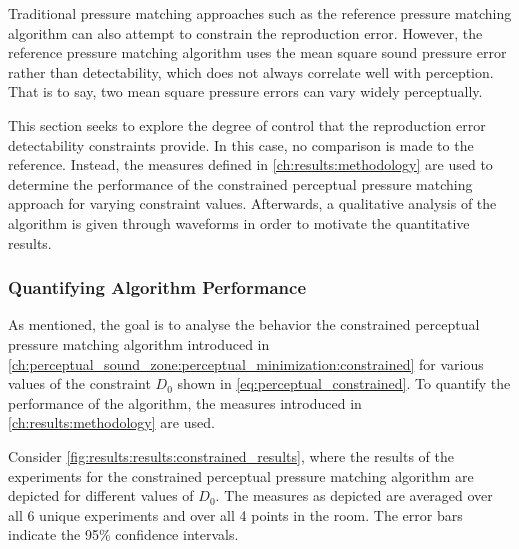 Traditional pressure matching approaches such as the reference pressure matching algorithm can also attempt to constrain the 
reproduction error.
However, the reference pressure matching algorithm uses the mean square sound pressure error rather than detectability,
which does not always correlate well with perception.
That is to say, two mean square pressure errors can vary widely perceptually.

This section seeks to explore the degree of control that the reproduction error detectability constraints provide.
In this case, no comparison is made to the reference.
Instead, the measures defined in \autoref{ch:results:methodology} are used to determine the performance of the 
constrained perceptual pressure matching approach for varying constraint values.
Afterwards, a qualitative analysis of the algorithm is given through waveforms in order to motivate the quantitative results.

\subsubsection*{Quantifying Algorithm Performance}

As mentioned, the goal is to analyse the behavior the constrained perceptual pressure matching algorithm
introduced in \autoref{ch:perceptual_sound_zone:perceptual_minimization:constrained} for various values of the 
constraint $D_0$ shown in \autoref{eq:perceptual_constrained}. 
To quantify the performance of the algorithm, the measures introduced in \autoref{ch:results:methodology} are used.

Consider \autoref{fig:results:results:constrained_results}, where the results of the 
experiments for the constrained perceptual pressure matching algorithm are depicted for different values of $D_0$. 
The measures as depicted are averaged over all 6 unique experiments and over all 4 points in the room. 
The error bars indicate the 95\% confidence intervals.

